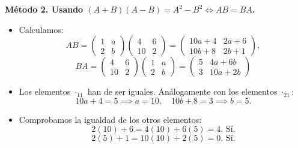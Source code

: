 \documentclass[a4paper,12pt]{article}
\begin{document}
\begin{ejercicio}[title=Ejercicio 2]

\textbf{Método 2. Usando $(A+B)(A-B) = A^2-B^2 \iff AB = BA$.}

\begin{itemize}
    \item Calculamos:
    \[
    AB = 
    \begin{pmatrix}
    1 & a\\ 2 & b
    \end{pmatrix}
    \begin{pmatrix}
    4 & 6\\ 10 & 2
    \end{pmatrix}
    =
    \begin{pmatrix}
    10a+4 & 2a+6\\
    10b+8 & 2b+1
    \end{pmatrix},
    \]
    \[
    BA = 
    \begin{pmatrix}
    4 & 6\\ 10 & 2
    \end{pmatrix}
    \begin{pmatrix}
    1 & a\\ 2 & b
    \end{pmatrix}
    =
    \begin{pmatrix}
    5 & 4a+6b\\
    3 & 10a+2b
    \end{pmatrix}
    \]
    \item Los elementos ${\cdot}_{11}$ han de ser iguales. Análogamente con los elementos ${\cdot}_{21}$:
    \[
    10a+4 = 5 \implies \boxed{a = 10}, \quad
    10b+8 = 3 \implies \boxed{b = 5}.
    \]
    \item Comprobamos la igualdad de los otros elementos:
    \[
    2(10)+6 = 4(10)+6(5) = 4. \text{ Sí}.
    \]\[
    2(5)+1 = 10(10)+2(5) = 0. \text{ Sí}.
    \]
\end{itemize}

\end{ejercicio}
\end{document}

